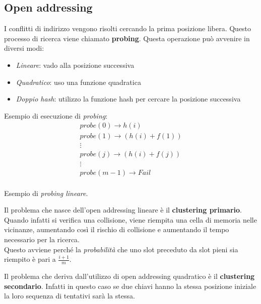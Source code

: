 \subsection{Open addressing}
I conflitti di indirizzo vengono risolti cercando la prima posizione libera. Questo processo di ricerca viene chiamato \textbf{probing}. Questa operazione può avvenire in diversi modi:
\begin{itemize}
	\item \emph{Lineare}: vado alla posizione successiva
	\item \emph{Quadratico}: uso una funzione quadratica
	\item \emph{Doppio hash}: utilizzo la funzione hash per cercare la posizione successiva
\end{itemize}
\begin{example}
	Esempio di esecuzione di \emph{probing}:
	\begin{gather*}
		probe(0) \longrightarrow h(i) \\
		probe(1) \longrightarrow (h(i) + f(1))\\
		\vdots \\
		probe(j) \longrightarrow (h(i) + f(j))\\
		\vdots \\
		probe(m-1) \longrightarrow Fail\\
	\end{gather*}
\end{example}

\begin{example}
	Esempio di \emph{probing lineare}.
\end{example}
\begin{observation}
	Il problema che nasce dell'open addressing lineare è il \textbf{clustering primario}. Quando infatti si verifica una collisione, viene riempita una cella di memoria nelle vicinanze, aumentando così il rischio di collisione e aumentando il tempo necessario per la ricerca. \\ Questo avviene perché la \emph{probabilità} che uno slot preceduto da slot pieni sia riempito è pari a $\frac{i + 1}{m}$.
\end{observation}
\begin{observation}
	Il problema che deriva dall'utilizzo di open addressing quadratico è il \textbf{clustering secondario}. Infatti in questo caso se due chiavi hanno la stessa posizione iniziale la loro sequenza di tentativi sarà la stessa.
\end{observation}